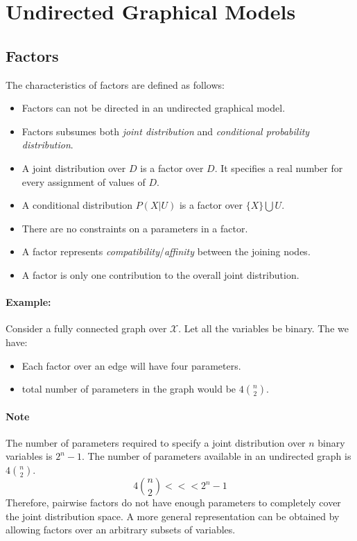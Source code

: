 \section{Undirected Graphical Models}\label{sec:undirected_graphical_models}

\subsection{Factors}\label{sec:factors}

The characteristics of factors are defined as follows:
\begin{itemize}
\item Factors can not be directed in an undirected graphical model.
\item Factors subsumes both \emph{joint distribution} and \emph{conditional probability distribution}.
\item A joint distribution over $D$ is a factor over $D$. It specifies a real number for every assignment of values of $D$.
\item A conditional distribution $P(X|U)$ is a factor over $\{X\} \bigcup U$.
\item There are no constraints on a parameters in a factor.
\item A factor represents \emph{compatibility}/\emph{affinity} between the joining nodes.
\item A factor is only one contribution to the overall joint distribution.
\end{itemize}

\paragraph{Example: } Consider a fully connected graph over $\mathcal{X}$.  Let all the variables be binary.  The we have:
\begin{itemize}
\item Each factor over an edge will have four parameters.
\item total number of parameters in the graph would be $4 \binom{n}{2}$.
\end{itemize}
\paragraph{Note} The number of parameters required to specify a joint distribution over $n$ binary variables is $2^n-1$.  The number of parameters available in an undirected graph is $4 \binom{n}{2}$. \[4 \binom{n}{2} <<< 2^n-1\]Therefore, pairwise factors do not have enough parameters to completely cover the joint distribution space. A more general representation can be obtained by allowing factors over an arbitrary subsets of variables.


